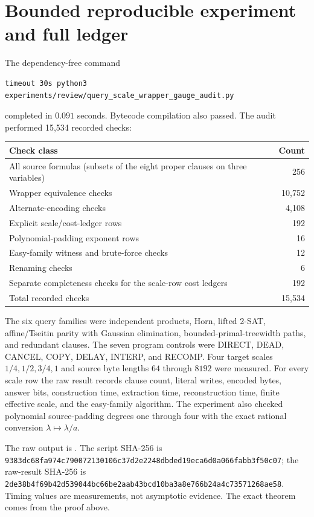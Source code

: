 \documentclass[11pt]{article}
\begin{document}
\section{Bounded reproducible experiment and full ledger}

The dependency-free command
\begin{verbatim}
timeout 30s python3 experiments/review/query_scale_wrapper_gauge_audit.py
\end{verbatim}
completed in $0.091$ seconds.  Bytecode compilation also passed.  The audit
performed 15,534 recorded checks:
\begin{center}\small
\begin{tabular}{@{}lr@{}}
\toprule
Check class & Count\\ \midrule
All source formulas (subsets of the eight proper clauses on three variables) & 256\\
Wrapper equivalence checks & 10,752\\
Alternate-encoding checks & 4,108\\
Explicit scale/cost-ledger rows & 192\\
Polynomial-padding exponent rows & 16\\
Easy-family witness and brute-force checks & 12\\
Renaming checks & 6\\
Separate completeness checks for the scale-row cost ledgers & 192\\
\midrule
Total recorded checks & 15,534\\
\bottomrule
\end{tabular}
\end{center}

The six query families were independent products, Horn, lifted 2-SAT,
affine/Tseitin parity with Gaussian elimination, bounded-primal-treewidth
paths, and redundant clauses.  The seven program controls were DIRECT, DEAD,
CANCEL, COPY, DELAY, INTERP, and RECOMP.  Four target scales
$1/4,1/2,3/4,1$ and source byte lengths $64$ through $8192$ were measured.
For every scale row the raw result records clause count, literal writes,
encoded bytes, answer bits, construction time, extraction time,
reconstruction time, finite effective scale, and the easy-family algorithm.
The experiment also checked polynomial source-padding degrees one through
four with the exact rational conversion $\lambda\mapsto\lambda/a$.

The raw output is
.
The script SHA-256 is
\nolinkurl{9383dc68fa974c790072130106c37d2e2248dbded19eca6d0a066fabb3f50c07};
the raw-result SHA-256 is
\nolinkurl{2de38b4f69b42d539044bc66be2aab43bcd10ba3a8e766b24a4c73571268ae58}.
Timing values are measurements, not asymptotic evidence.  The exact theorem
comes from the proof above.
\end{document}
